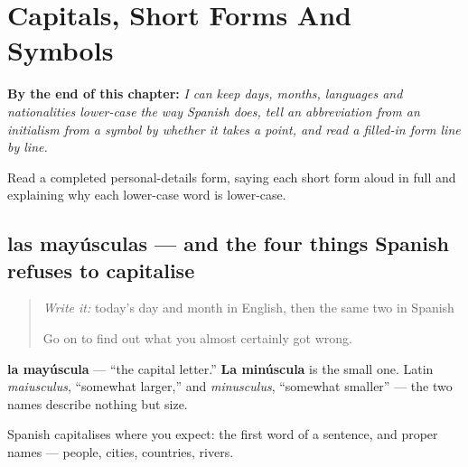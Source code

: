 
\chapter{Capitals, Short Forms And Symbols}
\label{ch:mayusculas-abreviaturas}

\begin{chapteropening}
\textbf{By the end of this chapter:} \emph{I can keep days, months, languages and nationalities lower-case the way Spanish does, tell an abbreviation from an initialism from a symbol by whether it takes a point, and read a filled-in form line by line.}

Read a completed personal-details form, saying each short form aloud in full and explaining why each lower-case word is lower-case.
\end{chapteropening}

\section[las mayúsculas]{las mayúsculas — and the four things Spanish refuses to capitalise}

\label{lesson:ES-C426-mayusculas}



\begin{quote}
\emph{Write it:} today's day and month in English, then the same two in Spanish

Go on to find out what you almost certainly got wrong.
\end{quote}

\begin{cousinweb}
\textbf{la mayúscula} — \textquotedblleft{}the capital letter.\textquotedblright{} \textbf{La minúscula} is the small one. Latin \emph{maiusculus}, \textquotedblleft{}somewhat larger,\textquotedblright{} and \emph{minusculus}, \textquotedblleft{}somewhat smaller\textquotedblright{} — the two names describe nothing but size.

Spanish capitalises where you expect: the first word of a sentence, and proper names — people, cities, countries, rivers.
\end{cousinweb}

